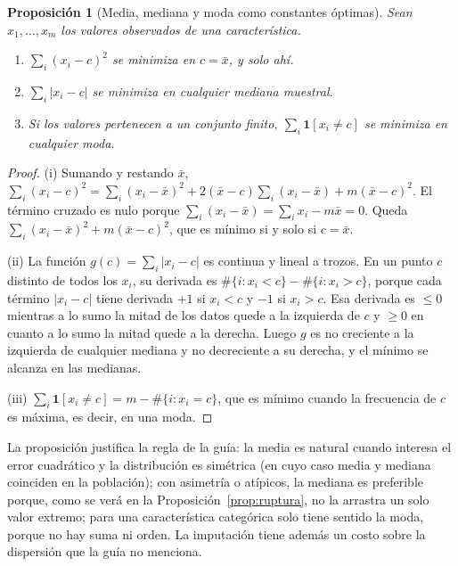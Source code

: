 \documentclass[11pt]{article}
\newtheorem{proposicion}[teorema]{Proposición}
\theoremstyle{definition}
\theoremstyle{remark}
\newcommand{\ind}[1]{\mathbf{1}\!\left[#1\right]}
\newcommand{\abs}[1]{\left\lvert #1\right\rvert}
\begin{document}
\begin{proposicion}[Media, mediana y moda como constantes óptimas]\label{prop:constantes}
\noindent Sean $x_1,\dots,x_m$ los valores observados de una característica.
\begin{enumerate}[label=(\roman*)]
\item $\sum_i(x_i-c)^2$ se minimiza en $c=\bar x$, y solo ahí.
\item $\sum_i\abs{x_i-c}$ se minimiza en cualquier mediana muestral.
\item Si los valores pertenecen a un conjunto finito, $\sum_i\ind{x_i\neq c}$ se minimiza en cualquier moda.
\end{enumerate}
\end{proposicion}
\begin{proof}
\noindent (i) Sumando y restando $\bar x$, $\sum_i(x_i-c)^2=\sum_i(x_i-\bar x)^2+2(\bar x-c)\sum_i(x_i-\bar x)+m(\bar x-c)^2$. El término cruzado es nulo porque $\sum_i(x_i-\bar x)=\sum_ix_i-m\bar x=0$. Queda $\sum_i(x_i-\bar x)^2+m(\bar x-c)^2$, que es mínimo si y solo si $c=\bar x$.

\medskip

\noindent (ii) La función $g(c)=\sum_i\abs{x_i-c}$ es continua y lineal a trozos. En un punto $c$ distinto de todos los $x_i$, su derivada es $\#\{i:x_i<c\}-\#\{i:x_i>c\}$, porque cada término $\abs{x_i-c}$ tiene derivada $+1$ si $x_i<c$ y $-1$ si $x_i>c$. Esa derivada es $\le0$ mientras a lo sumo la mitad de los datos quede a la izquierda de $c$ y $\ge0$ en cuanto a lo sumo la mitad quede a la derecha. Luego $g$ es no creciente a la izquierda de cualquier mediana y no decreciente a su derecha, y el mínimo se alcanza en las medianas.

\medskip

\noindent (iii) $\sum_i\ind{x_i\ne c}=m-\#\{i:x_i=c\}$, que es mínimo cuando la frecuencia de $c$ es máxima, es decir, en una moda.
\end{proof}

\noindent La proposición justifica la regla de la guía: la media es natural cuando interesa el error cuadrático y la distribución es simétrica (en cuyo caso media y mediana coinciden en la población); con asimetría o atípicos, la mediana es preferible porque, como se verá en la Proposición~\ref{prop:ruptura}, no la arrastra un solo valor extremo; para una característica categórica solo tiene sentido la moda, porque no hay suma ni orden. La imputación tiene además un costo sobre la dispersión que la guía no menciona.
\end{document}
